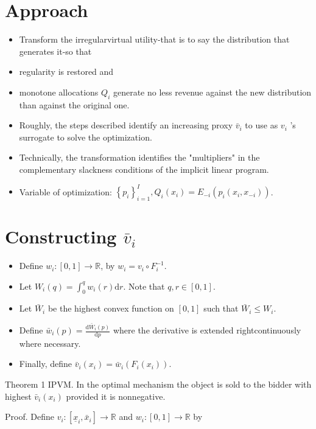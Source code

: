 \documentclass[10pt]{article}
\begin{document}
\section*{Approach}
\begin{itemize}
  \item Transform the irregularvirtual utility-that is to say the distribution that generates it-so that
  \item regularity is restored and
  \item monotone allocations $Q_{i}$ generate no less revenue against the new distribution than against the original one.
  \item Roughly, the steps described identify an increasing proxy $\bar{v}_{i}$ to use as $v_{i}$ 's surrogate to solve the optimization.
  \item Technically, the transformation identifies the "multipliers" in the complementary slackness conditions of the implicit linear program.
  \item Variable of optimization: $\left\{p_{i}\right\}_{i=1}^{I}, Q_{i}\left(x_{i}\right)=E_{-i}\left(p_{i}\left(x_{i}, x_{-i}\right)\right)$.
\end{itemize}

\section*{Constructing $\bar{v}_{i}$}
\begin{itemize}
  \item Define $w_{i}:[0,1] \rightarrow \mathbb{R}$, by $w_{i}=v_{i} \circ F_{i}^{-1}$.
  \item Let $W_{i}(q)=\int_{0}^{q} w_{i}(r) \mathrm{d} r$. Note that $q, r \in[0,1]$.
  \item Let $\bar{W}_{i}$ be the highest convex function on $[0,1]$ such that $\bar{W}_{i} \leq W_{i}$.
  \item Define $\bar{w}_{i}(p)=\frac{\mathrm{d} \bar{W}_{i}(p)}{\mathrm{d} p}$ where the derivative is extended rightcontinuously where necessary.
  \item Finally, define $\bar{v}_{i}\left(x_{i}\right)=\bar{w}_{i}\left(F_{i}\left(x_{i}\right)\right)$.
\end{itemize}

Theorem 1 IPVM. In the optimal mechanism the object is sold to the bidder with highest $\bar{v}_{i}\left(x_{i}\right)$ provided it is nonnegative.

Proof. Define $v_{i}:\left[\underline{x}_{i}, \bar{x}_{i}\right] \rightarrow \mathbb{R}$ and $w_{i}:[0,1] \rightarrow \mathbb{R}$ by
\end{document}
